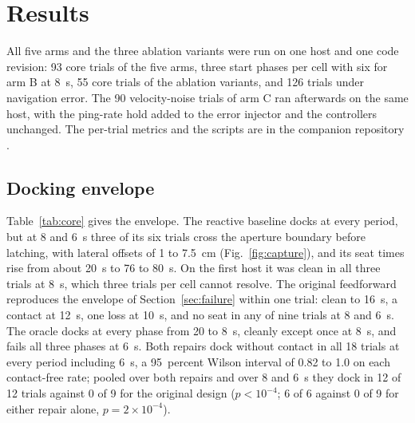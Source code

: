 \section{Results}
\label{sec:results}

All five arms and the three ablation variants were run on one host and one code revision: 93 core trials of the five arms, three start phases per cell with six for arm B at 8~s, 55 core trials of the ablation variants, and 126 trials under navigation error. The 90 velocity-noise trials of arm C ran afterwards on the same host, with the ping-rate hold added to the error injector and the controllers unchanged. The per-trial metrics and the scripts are in the companion repository \cite{choi2026code}.

\subsection{Docking envelope}

Table~\ref{tab:core} gives the envelope. The reactive baseline docks at every period, but at 8 and 6~s three of its six trials cross the aperture boundary before latching, with lateral offsets of 1 to 7.5~cm (Fig.~\ref{fig:capture}), and its seat times rise from about 20~s to 76 to 80~s. On the first host it was clean in all three trials at 8~s, which three trials per cell cannot resolve. The original feedforward reproduces the envelope of Section~\ref{sec:failure} within one trial: clean to 16~s, a contact at 12~s, one loss at 10~s, and no seat in any of nine trials at 8 and 6~s. The oracle docks at every phase from 20 to 8~s, cleanly except once at 8~s, and fails all three phases at 6~s. Both repairs dock without contact in all 18 trials at every period including 6~s, a 95~percent Wilson interval of 0.82 to 1.0 on each contact-free rate; pooled over both repairs and over 8 and 6~s they dock in 12 of 12 trials against 0 of 9 for the original design ($p < 10^{-4}$; 6 of 6 against 0 of 9 for either repair alone, $p = 2 \times 10^{-4}$).



